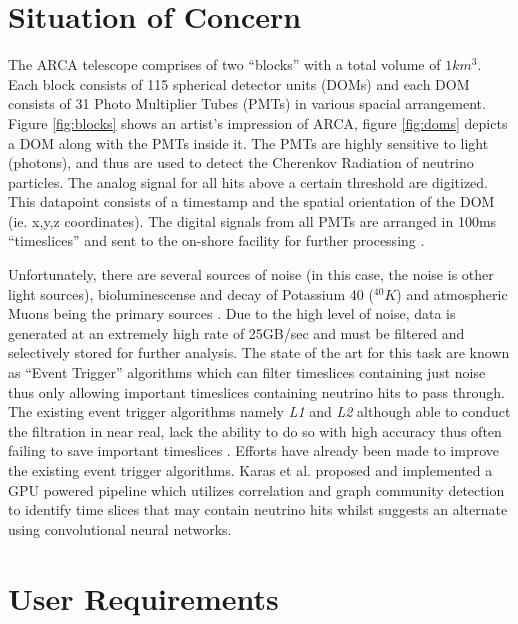 \section{Situation of Concern}
\label{sec:soc}

The ARCA telescope comprises of two ``blocks'' with a total volume of
$1km^{3}$. Each block consists of 115 spherical detector units (DOMs)
and each DOM consists of 31 Photo Multiplier Tubes (PMTs) in various
spacial arrangement. Figure \ref{fig:blocks} shows an artist's
impression of ARCA, figure \ref{fig:doms} depicts a DOM along with the
PMTs inside it. The PMTs are highly sensitive to light (photons), and
thus are used to detect the Cherenkov Radiation of neutrino particles.
The analog signal for all hits above a certain threshold are
digitized. This datapoint consists of a timestamp and the spatial
orientation of the DOM (ie. x,y,z coordinates). The digital signals
from all PMTs are arranged in 100ms ``timeslices'' and sent to the
on-shore facility for further processing \cite{aiello2019km3net}.

Unfortunately, there are several sources of noise (in this case, the
noise is other light sources), bioluminescense and decay of Potassium
40 ($^{40}K$) and atmospheric Muons being the primary sources
\cite{post2019km3nnet}. Due to the high level of noise, data is
generated at an extremely high rate of 25GB/sec
\cite{adrian2016letter} and must be filtered and selectively stored
for further analysis. The state of the art for this task are known as
``Event Trigger'' algorithms \cite{adrian2016letter,aiello2019km3net}
which can filter timeslices containing just noise thus only allowing
important timeslices containing neutrino hits to pass through. The
existing event trigger algorithms namely \emph{L1} and \emph{L2}
although able to conduct the filtration in near real, lack the ability
to do so with high accuracy thus often failing to save important
timeslices \cite{karas2019data}. Efforts have already been made to
improve the existing event trigger algorithms. Karas et al. proposed
and implemented a GPU powered pipeline which utilizes correlation and
graph community detection to identify time slices that may contain
neutrino hits whilst \cite{post2019km3nnet} suggests an alternate
using convolutional neural networks.

\section{User Requirements}
\label{sec:user-req}

